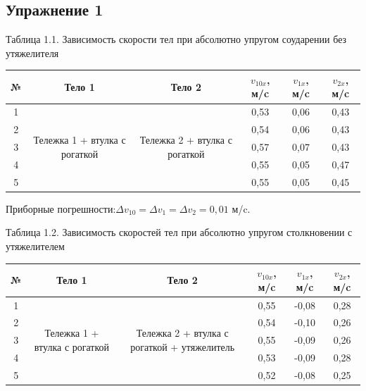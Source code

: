 \documentclass[12pt]{article}
\begin{document}
\subsection*{Упражнение 1}
\begin{center}
Таблица 1.1. Зависимость скорости тел при абсолютно упругом соударении без утяжелителя 
\begin{table}[h!]
\begin{center}
\begin{tabular}{|c|c|c|c|c|c|}
\hline
 № & Тело 1 & Тело 2 & $v_{10x}$, м/c & $v_{1x}$, м/c & $v_{2x}$, м/c \\
\hline
 1 &\multirow{5}{60pt}{Тележка 1 + втулка с рогаткой}    & \multirow{5}{60pt}{Тележка 2 + втулка с рогаткой} & 0,53&	0,06	&0,43 \\
\hhline{-~~---}

 2 &    &  & 0,54&	0,06	&0,43 \\
\hhline{-~~---}
 3 &   &  & 0,57&	0,07&	0,43 \\
\hhline{-~~---}
 4 &  &  &0,55	&0,05&	0,47 \\
\hhline{-~~---}
 5 &    &  & 0,55&	0,05&	0,45 \\
\hline
\end{tabular}

Приборные погрешности:$\Delta v_{10}=\Delta v_{1}=\Delta v_{2} = 0,01$ м/c. 
\end{center}
\end{table} 

Таблица 1.2. Зависимость скоростей тел при абсолютно упругом столкновении с утяжелителем
\begin{table}[h!]
\begin{center}
\begin{tabular}{|c|c|c|c|c|c|}
\hline
 № & Тело 1 & Тело 2 & $v_{10x}$, м/c & $v_{1x}$, м/c & $v_{2x}$, м/c \\
\hline
 1 &\multirow{5}{70pt}{Тележка 1 + втулка с рогаткой}    & \multirow{5}{70pt}{Тележка 2 + втулка с рогаткой + утяжелитель} & 0,55&	-0,08&	0,28 \\
\hhline{-~~---}

 2 &    &  & 0,54&	-0,10&	0,26 \\
\hhline{-~~---}
 3 &   &  &0,55	&-0,09	&0,26 \\
\hhline{-~~---}
 4 &  &  &0,53&	-0,09	&0,28 \\
\hhline{-~~---}
 5 &    &  & 0,52&	-0,08	&0,25 \\
\hline
\end{tabular}
\end{center}
\end{table}


\end{center}
\end{document}

